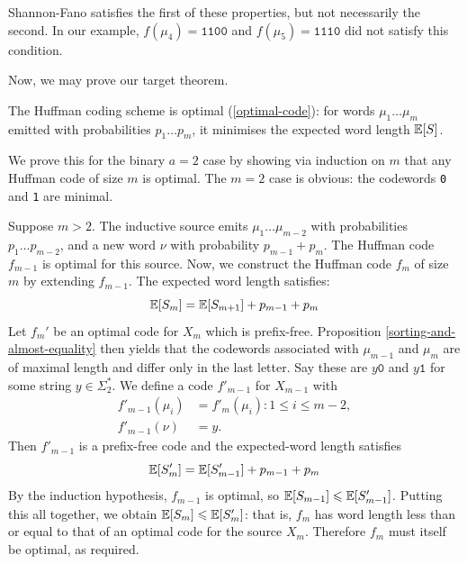 \documentclass{article}
\begin{document}
\begin{note}
	Shannon-Fano satisfies the first of these properties,
	but not necessarily the second.
	In our example,
	$f(\mu_4) = \texttt{1100}$ and
	$f(\mu_5) = \texttt{1110}$
	did not satisfy this condition.
\end{note}

Now, we may prove our target theorem.

\begin{theorem}
    The Huffman coding scheme is optimal (\ref{optimal-code}):
    for words $\mu_1 \dots \mu_m$
    emitted with probabilities $p_1 \dots p_m$,
    it minimises the expected word length $\mathbb{E}[S]$.
\end{theorem}

\begin{prf}
	We prove this for the binary $a=2$ case
	by showing via induction on $m$ that any Huffman code of size $m$ is optimal.
	The $m=2$ case is obvious:
	the codewords \texttt{0} and \texttt{1} are minimal.
	
	Suppose $m > 2$.
	The inductive source emits $\mu_1 \dots \mu_{m-2}$
	with probabilities $p_1 \dots p_{m-2}$,
	and a new word $\nu$ with probability $p_{m-1} + p_m$.
	The Huffman code $f_{m-1}$ is optimal for this source.
	Now, we construct the Huffman code $f_m$ of size $m$
	by extending $f_{m-1}$.
	The expected word length satisfies:
	\[
	\mathbb{E}[S_m] = \mathbb{E}[S_{m+1}] + p_{m-1} + p_m
	\]
	Let $f_m'$ be an optimal code for $X_m$ which is prefix-free.
	Proposition \ref{sorting-and-almost-equality} then yields that
	the codewords associated with $\mu_{m-1}$ and $\mu_m$ are of maximal length
	and differ only in the last letter. 
	Say these are $y\texttt{0}$ and $y\texttt{1}$
	for some string $y \in \Sigma_2^*$.
	We define a code $f'_{m-1}$ for $X_{m-1}$ with
	\begin{align*}
    	f'_{m-1}(\mu_i) &= f'_{m}(\mu_i) : 1 \leq i \leq m-2, \\
    	f'_{m-1}(\nu) &= y.
	\end{align*}
	Then $f'_{m-1}$ is a prefix-free code
	and the expected-word length satisfies
	\[
	\mathbb{E}[S_{m}'] = \mathbb{E}[S'_{m-1}] + p_{m-1} + p_m
	\]
	By the induction hypothesis, $f_{m-1}$ is optimal,
	so $\mathbb{E}[S_{m-1}] \leqslant \mathbb{E}[S'_{m-1}]$.
	Putting this all together, we obtain $\mathbb{E}[S_m] \leqslant \mathbb{E}[S'_m]$:
	that is, $f_m$ has word length less than or equal to
	that of an optimal code for the source $X_m$.
	Therefore $f_m$ must itself be optimal, as required.
\end{prf}
\end{document}
